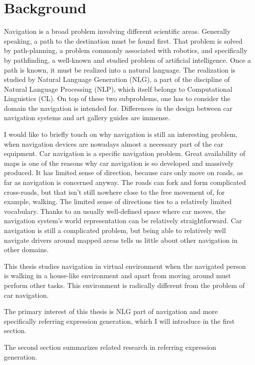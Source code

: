 \chapter{Background}
\label{chap:bg}
Navigation is a broad problem involving different scientific areas. Generally speaking, a path to the destination must be found first. That problem is solved by path-planning, a problem commonly associated with robotics, and specifically by pathfinding, a well-known and studied problem of artificial intelligence. Once a path is known, it must be realized into a natural language. The realization is studied by Natural Language Generation (NLG), a part of the discipline of Natural Language Processing (NLP), which itself belongs to Computational Linguistics (CL). On top of these two subproblems, one has to consider the domain the navigation is intended for. Differences in the design between car navigation systems and art gallery guides are immense.

I would like to briefly touch on why navigation is still an interesting problem, when navigation devices are nowadays almost a necessary part of the car equipment. Car navigation is a specific navigation problem. Great availability of maps is one of the reasons why car navigation is so developed and massively produced. It has limited sense of direction, because cars only move on roads, as far as navigation is concerned anyway. The roads can fork and form complicated cross-roads, but that isn't still nowhere close to the free movement of, for example, walking. The limited sense of directions ties to a relatively limited vocabulary. Thanks to an usually well-defined space where car moves, the navigation system's world representation can be relatively straightforward. Car navigation is still a complicated problem, but being able to relatively well navigate drivers around mapped areas tells us little about other navigation in other domains.

This thesis studies navigation in virtual environment when the navigated person is walking in a house-like environment and apart from moving around must perform other tasks. This environment is radically different from the problem of car navigation. 

The primary interest of this thesis is NLG part of navigation and more specifically referring expression generation, which I will introduce in the first section. 

The second section summarizes related research in referring expression generation. 


